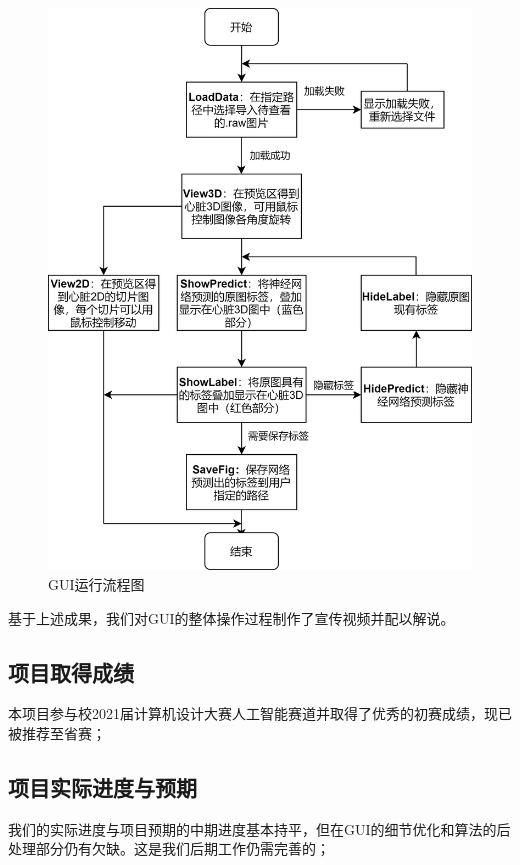 \documentclass[lang=cn,11pt,a4paper,cite=numbers]{elegantpaper}
\begin{document}
\begin{figure}[H]
    \centering
    \includegraphics[scale=1]{./image/前期总结/GUIDiagram.png}
    \caption{GUI运行流程图}
    \label{fig:GUIDiagram}
\end{figure}

基于上述成果，我们对GUI的整体操作过程制作了宣传视频并配以解说。

\subsection{项目取得成绩}
本项目参与校2021届计算机设计大赛人工智能赛道并取得了优秀的初赛成绩，现已被推荐至省赛；

\subsection{项目实际进度与预期}
我们的实际进度与项目预期的中期进度基本持平，但在GUI的细节优化和算法的后处理部分仍有欠缺。这是我们后期工作仍需完善的；
\end{document}
